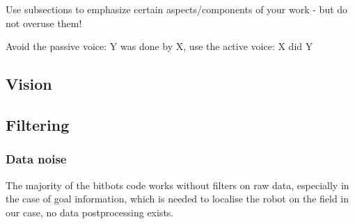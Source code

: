 \documentclass[lnicst,a4paper]{svmultln}
\begin{document}
Use subsections to emphasize certain aspects/components of
your work -
but do not overuse them!

Avoid the passive voice: Y was done by X, use the active voice: X did Y





\subsection{Vision}





\subsection{Filtering}

\subsubsection{Data noise}
The majority of the bitbots code works without filters on raw data, especially in the case of goal information, which is needed to localise the robot on the field in our case, no data postprocessing exists.
\end{document}

